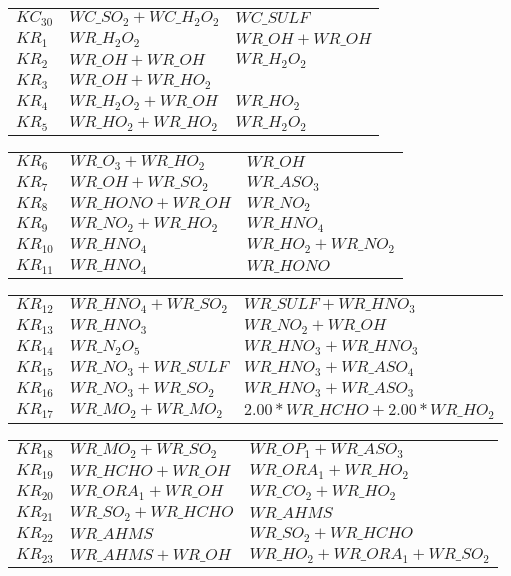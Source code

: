 {\begin{tabular}{l@{\,:\,}p{0.2\chfwidth}@{$\quad\longrightarrow\quad$}p{0.6\chfwidth}}
$KC_{30}$ & $WC\_SO_{2}+WC\_H_{2}O_{2}$ & $WC\_SULF$ \\
$KR_{1}$ & $WR\_H_{2}O_{2}$ & $WR\_OH+WR\_OH$ \\
$KR_{2}$ & $WR\_OH+WR\_OH$ & $WR\_H_{2}O_{2}$ \\
$KR_{3}$ & $WR\_OH+WR\_HO_{2}$ &  \\
$KR_{4}$ & $WR\_H_{2}O_{2}+WR\_OH$ & $WR\_HO_{2}$ \\
$KR_{5}$ & $WR\_HO_{2}+WR\_HO_{2}$ & $WR\_H_{2}O_{2}$ \\
\end{tabular}
 
\begin{tabular}{l@{\,:\,}p{0.2\chfwidth}@{$\quad\longrightarrow\quad$}p{0.6\chfwidth}}
$KR_{6}$ & $WR\_O_{3}+WR\_HO_{2}$ & $WR\_OH$ \\
$KR_{7}$ & $WR\_OH+WR\_SO_{2}$ & $WR\_ASO_{3}$ \\
$KR_{8}$ & $WR\_HONO+WR\_OH$ & $WR\_NO_{2}$ \\
$KR_{9}$ & $WR\_NO_{2}+WR\_HO_{2}$ & $WR\_HNO_{4}$ \\
$KR_{10}$ & $WR\_HNO_{4}$ & $WR\_HO_{2}+WR\_NO_{2}$ \\
$KR_{11}$ & $WR\_HNO_{4}$ & $WR\_HONO$ \\
\end{tabular}
 
\begin{tabular}{l@{\,:\,}p{0.2\chfwidth}@{$\quad\longrightarrow\quad$}p{0.6\chfwidth}}
$KR_{12}$ & $WR\_HNO_{4}+WR\_SO_{2}$ & $WR\_SULF+WR\_HNO_{3}$ \\
$KR_{13}$ & $WR\_HNO_{3}$ & $WR\_NO_{2}+WR\_OH$ \\
$KR_{14}$ & $WR\_N_{2}O_{5}$ & $WR\_HNO_{3}+WR\_HNO_{3}$ \\
$KR_{15}$ & $WR\_NO_{3}+WR\_SULF$ & $WR\_HNO_{3}+WR\_ASO_{4}$ \\
$KR_{16}$ & $WR\_NO_{3}+WR\_SO_{2}$ & $WR\_HNO_{3}+WR\_ASO_{3}$ \\
$KR_{17}$ & $WR\_MO_{2}+WR\_MO_{2}$ & $2.00*WR\_HCHO+2.00*WR\_HO_{2}$ \\
\end{tabular}
 
\begin{tabular}{l@{\,:\,}p{0.2\chfwidth}@{$\quad\longrightarrow\quad$}p{0.6\chfwidth}}
$KR_{18}$ & $WR\_MO_{2}+WR\_SO_{2}$ & $WR\_OP_{1}+WR\_ASO_{3}$ \\
$KR_{19}$ & $WR\_HCHO+WR\_OH$ & $WR\_ORA_{1}+WR\_HO_{2}$ \\
$KR_{20}$ & $WR\_ORA_{1}+WR\_OH$ & $WR\_CO_{2}+WR\_HO_{2}$ \\
$KR_{21}$ & $WR\_SO_{2}+WR\_HCHO$ & $WR\_AHMS$ \\
$KR_{22}$ & $WR\_AHMS$ & $WR\_SO_{2}+WR\_HCHO$ \\
$KR_{23}$ & $WR\_AHMS+WR\_OH$ & $WR\_HO_{2}+WR\_ORA_{1}+WR\_SO_{2}$ \\
\end{tabular}
 
}
